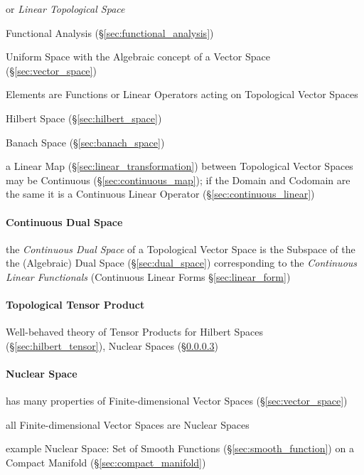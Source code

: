 or \emph{Linear Topological Space}

Functional Analysis (\S\ref{sec:functional_analysis})

Uniform Space with the Algebraic concept of a Vector Space
(\S\ref{sec:vector_space})

Elements are Functions or Linear Operators acting on Topological
Vector Spaces

Hilbert Space (\S\ref{sec:hilbert_space})

Banach Space (\S\ref{sec:banach_space})

a Linear Map (\S\ref{sec:linear_transformation}) between Topological Vector
Spaces may be Continuous (\S\ref{sec:continuous_map}); if the Domain
and Codomain are the same it is a Continuous Linear Operator
(\S\ref{sec:continuous_linear})



\paragraph{Continuous Dual Space}\label{sec:continuous_dual_space}
\hfill

the \emph{Continuous Dual Space} of a Topological Vector Space is the Subspace
of the the (Algebraic) Dual Space (\S\ref{sec:dual_space}) corresponding to the
\emph{Continuous Linear Functionals} (Continuous Linear Forms
\S\ref{sec:linear_form})



\paragraph{Topological Tensor Product}\label{sec:topological_tensor}
\hfill

Well-behaved theory of Tensor Products for Hilbert Spaces
(\S\ref{sec:hilbert_tensor}), Nuclear Spaces
(\S\ref{sec:nuclear_space})



\paragraph{Nuclear Space}\label{sec:nuclear_space}\hfill

has many properties of Finite-dimensional Vector Spaces
(\S\ref{sec:vector_space})

all Finite-dimensional Vector Spaces are Nuclear Spaces

example Nuclear Space: Set of Smooth Functions
(\S\ref{sec:smooth_function}) on a Compact Manifold
(\S\ref{sec:compact_manifold})



